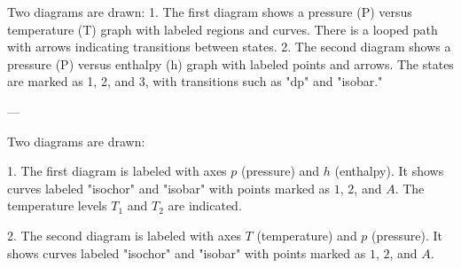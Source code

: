 Two diagrams are drawn:  
1. The first diagram shows a pressure (P) versus temperature (T) graph with labeled regions and curves. There is a looped path with arrows indicating transitions between states.  
2. The second diagram shows a pressure (P) versus enthalpy (h) graph with labeled points and arrows. The states are marked as 1, 2, and 3, with transitions such as "dp" and "isobar."  

---

Two diagrams are drawn:  

1. The first diagram is labeled with axes \( p \) (pressure) and \( h \) (enthalpy). It shows curves labeled "isochor" and "isobar" with points marked as \( 1 \), \( 2 \), and \( A \). The temperature levels \( T_1 \) and \( T_2 \) are indicated.  

2. The second diagram is labeled with axes \( T \) (temperature) and \( p \) (pressure). It shows curves labeled "isochor" and "isobar" with points marked as \( 1 \), \( 2 \), and \( A \).